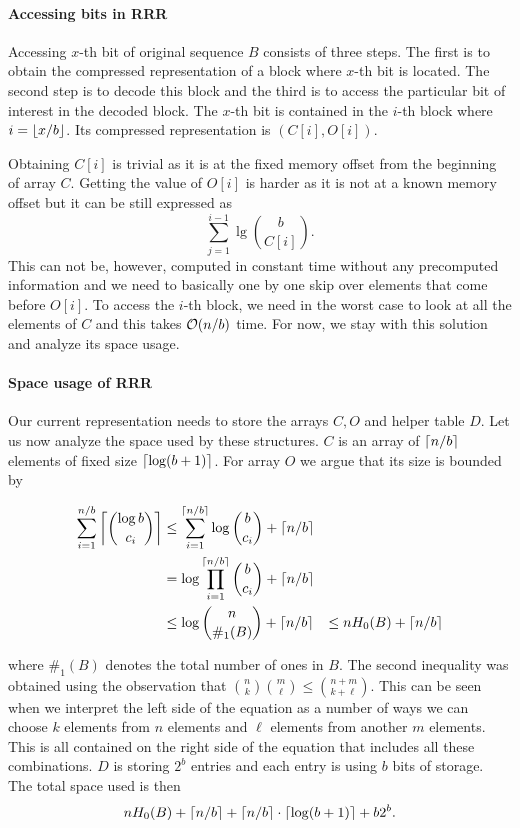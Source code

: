 \paragraph{Accessing bits in RRR}

Accessing $x$-th bit of original sequence $B$ consists of three steps. The first is to obtain the
compressed representation of a block where $x$-th bit is located. The second step is to decode this block and
the third is to access the particular bit of interest in the decoded block. The $x$-th bit is contained in the
$i$-th block where $i=\left\lfloor x/b \right\rfloor$. Its compressed representation is $(C[i], O[i])$.

Obtaining $C[i]$ is trivial as it is at the fixed memory offset from the beginning of array $C$. Getting the
value of $O[i]$ is harder as it is not at a known memory offset but it can be still expressed as
$$\sum_{j=1}^{i-1} \lg {b\choose C[i]}.$$ This can not be, however, computed in constant time without
any precomputed information and we need to basically one by one skip over elements that come before $O[i]$.
To access the $i$-th block, we need in the worst case to look at all the elements of $C$ and this
takes $\mathcal{O}(n/b)$ time. For now, we stay with this solution and analyze its space usage.

\paragraph{Space usage of RRR}

Our current representation needs to store the arrays $C, O$ and helper table $D$. Let us now
analyze the space used by these structures. $C$ is an array of $\left\lceil n/b \right\rceil$ elements of fixed size
$\left\lceil \log(b+1) \right\rceil$. For array $O$ we argue that its size is bounded by

\begin{align*}
    \sum_{i=1}^{n/b} \left\lceil {\log b\choose c_i} \right\rceil
    &\leq \sum_{i=1}^{\left\lceil n/b \right\rceil} \log {b\choose c_i} + \left\lceil n/b \right\rceil \\
    &= \log\prod_{i=1}^{\left\lceil n/b \right\rceil} {b\choose c_i} + \left\lceil n/b \right\rceil \\
    &\leq \log{n\choose \#_1(B)} + \left\lceil n/b \right\rceil &\leq nH_0(B) + \left\lceil n/b \right\rceil
\end{align*}

where $\#_1(B)$ denotes the total number of ones in $B$. The second inequality was obtained using
the observation that ${n\choose k} {m\choose \ell} \leq {n+m\choose k+\ell}$. This can be seen
when we interpret the left side of the equation as a number of ways we can choose $k$ elements
from $n$ elements and $\ell$ elements from another $m$ elements. This is all contained on the
right side of the equation that includes all these combinations. $D$ is storing $2^b$ entries
and each entry is using $b$ bits of storage. The total space used is then
$$nH_0(B) + \left\lceil n/b \right\rceil + \left\lceil n/b \right\rceil \cdot \left\lceil \log(b+1) \right\rceil + b2^b.$$

